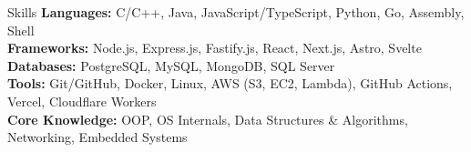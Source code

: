 \begin{rSection}{Skills}
	\textbf{Languages:} C/C++, Java, JavaScript/TypeScript, Python, Go, Assembly, Shell\\
	\textbf{Frameworks:} Node.js, Express.js, Fastify.js, React, Next.js, Astro, Svelte\\
	\textbf{Databases:} PostgreSQL, MySQL, MongoDB, SQL Server\\
	\textbf{Tools:} Git/GitHub, Docker, Linux, AWS (S3, EC2, Lambda), GitHub Actions, Vercel, Cloudflare Workers\\
	\textbf{Core Knowledge:} OOP, OS Internals, Data Structures \& Algorithms, Networking, Embedded Systems
\end{rSection}